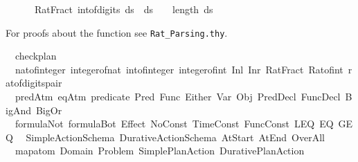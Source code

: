 \begin{isabellebody}
\ \ \ \ \ \ Rat{\isachardot}{\kern0pt}Fract\ {\isacharparenleft}{\kern0pt}int{\isacharunderscore}{\kern0pt}of{\isacharunderscore}{\kern0pt}digits\ {\isacharparenleft}{\kern0pt}ds\ {\isacharat}{\kern0pt}\ ds\ {}{\isacharparenright}{\kern0pt}\ {\isacharparenleft}{\kern0pt}{}{}\ {\isacharcircum}{\kern0pt}\ length\ ds\isanewline
\ \ {\isacharparenright}{\kern0pt}{\isachardoublequoteclose}%
\begin{isamarkuptext}%
For proofs about the function  see \texttt{Rat\_Parsing.thy}.%
\end{isamarkuptext}\isamarkuptrue%
%
\isadelimdocument
%
\endisadelimdocument
%
\isatagdocument
%
\isamarkuptrue%
%
\endisatagdocument
{\isafolddocument}%
%
\isadelimdocument
%
\endisadelimdocument
{}\isamarkupfalse%
\isanewline
\ \ check{\isacharunderscore}{\kern0pt}plan\isanewline
\ \ nat{\isacharunderscore}{\kern0pt}of{\isacharunderscore}{\kern0pt}integer\ integer{\isacharunderscore}{\kern0pt}of{\isacharunderscore}{\kern0pt}nat\ int{\isacharunderscore}{\kern0pt}of{\isacharunderscore}{\kern0pt}integer\ integer{\isacharunderscore}{\kern0pt}of{\isacharunderscore}{\kern0pt}int\ Inl\ Inr\ Rat{\isachardot}{\kern0pt}Fract\ Rat{\isachardot}{\kern0pt}of{\isacharunderscore}{\kern0pt}int\ rat{\isacharunderscore}{\kern0pt}of{\isacharunderscore}{\kern0pt}digits{\isacharunderscore}{\kern0pt}pair\isanewline
\ \ predAtm\ eqAtm\ predicate\ Pred\ Func\ Either\ Var\ Obj\ PredDecl\ FuncDecl\ BigAnd\ BigOr\isanewline
\ \ formula{\isachardot}{\kern0pt}Not\ formula{\isachardot}{\kern0pt}Bot\ Effect\ No{\isacharunderscore}{\kern0pt}Const\ Time{\isacharunderscore}{\kern0pt}Const\ Func{\isacharunderscore}{\kern0pt}Const\ LEQ\ EQ\ GEQ\isanewline
\ \ Simple{\isacharunderscore}{\kern0pt}Action{\isacharunderscore}{\kern0pt}Schema\ Durative{\isacharunderscore}{\kern0pt}Action{\isacharunderscore}{\kern0pt}Schema\ At{\isacharunderscore}{\kern0pt}Start\ At{\isacharunderscore}{\kern0pt}End\ Over{\isacharunderscore}{\kern0pt}All\isanewline
\ \ map{\isacharunderscore}{\kern0pt}atom\ Domain\ Problem\ Simple{\isacharunderscore}{\kern0pt}Plan{\isacharunderscore}{\kern0pt}Action\ Durative{\isacharunderscore}{\kern0pt}Plan{\isacharunderscore}{\kern0pt}Action\isanewline

\end{isabellebody}
